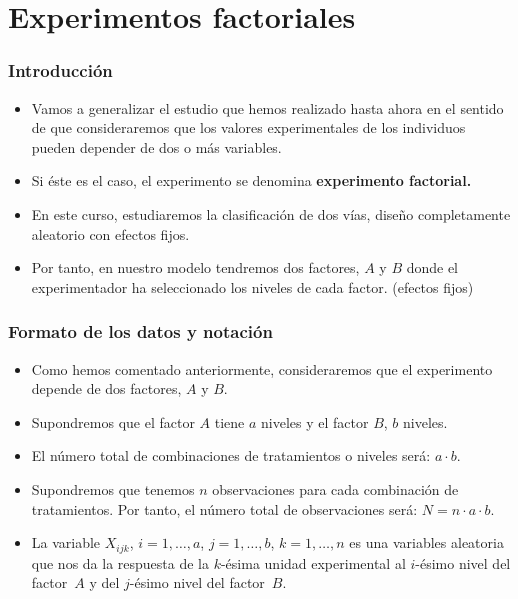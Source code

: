 \section{Experimentos factoriales}
\begin{frame}
\frametitle{Introducción}
\begin{itemize}
\item<2-> Vamos a generalizar el estudio que hemos realizado hasta ahora en el sentido de que consideraremos que los valores experimentales de los individuos pueden depender de dos o más variables.
\item<3-> Si éste es el caso, el experimento se denomina {\bf experimento factorial.}
\item<4-> En este curso, estudiaremos la clasificación de dos vías, diseño completamente aleatorio con efectos fijos.
\item<5-> Por tanto, en nuestro modelo tendremos dos factores, $A$ y $B$ donde el experimentador ha seleccionado los niveles de cada factor. (efectos fijos)
\end{itemize}
\end{frame}
\begin{frame}
\frametitle{Formato de los datos y notación}
\begin{itemize}
\item<2-> Como hemos comentado anteriormente, consideraremos que el experimento depende de dos factores, $A$ y $B$.
\item<3-> Supondremos que el factor $A$ tiene $a$ niveles y el factor $B$, $b$ niveles. 
\item<4-> El número total de combinaciones de tratamientos o niveles será: $a\cdot b$.
\item<5-> Supondremos que tenemos $n$ observaciones para cada combinación de tratamientos. Por tanto, el número total de observaciones será: $N= n\cdot a\cdot b$.
\item<6-> La variable $X_{ijk}$, $i=1,\ldots,a$, $j=1,\ldots,b$, $k=1,\ldots,n$ es una variables aleatoria que nos da la respuesta de la $k$-ésima unidad experimental al $i$-ésimo nivel del factor~$A$ y del $j$-ésimo nivel del factor~$B$.
\end{itemize}
\end{frame}
